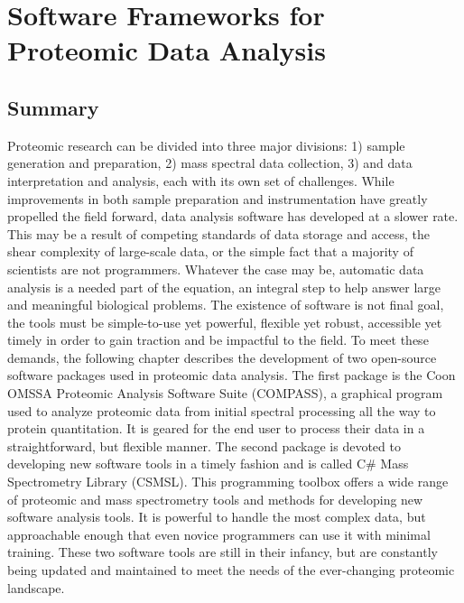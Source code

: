 \chapter{Software Frameworks for Proteomic Data Analysis}

\def\compass{COMPASS}
\def\csmsl{CSMSL}

\section{Summary}
Proteomic research can be divided into three major divisions: 1) sample generation and preparation, 2) mass spectral data collection, 3) and data interpretation and analysis, each with its own set of challenges. While improvements in both sample preparation and instrumentation have greatly propelled the field forward, data analysis software has developed at a slower rate. This may be a result of competing standards of data storage and access, the shear complexity of large-scale data, or the simple fact that a majority of scientists are not programmers. Whatever the case may be, automatic data analysis is a needed part of the equation, an integral step to help answer large and meaningful biological problems. The existence of software is not final goal, the tools must be simple-to-use yet powerful, flexible yet robust, accessible yet timely in order to gain traction and be impactful to the field. To meet these demands, the following chapter describes the development of two open-source software packages used in proteomic data analysis. The first package is the Coon OMSSA Proteomic Analysis Software Suite (\compass{}), a graphical program used to analyze proteomic data from initial spectral processing all the way to protein quantitation. It is geared for the end user to process their data in a straightforward, but flexible manner. The second package is devoted to developing new software tools in a timely fashion and is called C\# Mass Spectrometry Library (\csmsl{}). This programming toolbox offers a wide range of proteomic and mass spectrometry tools and methods for developing new software analysis tools. It is powerful to handle the most complex data, but approachable enough that even novice programmers can use it with minimal training. These two software tools are still in their infancy, but are constantly being updated and maintained to meet the needs of the ever-changing proteomic landscape.

